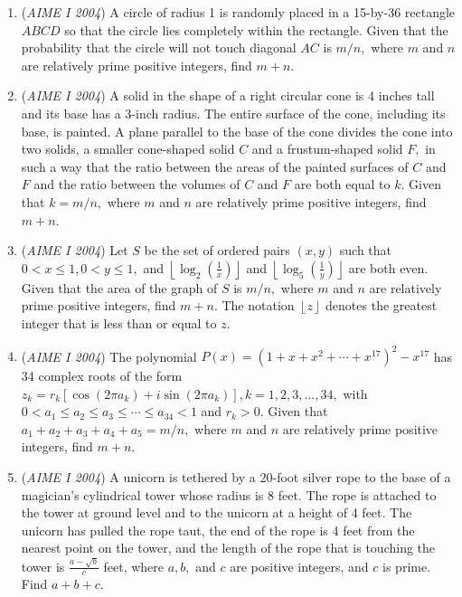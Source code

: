 \begin{enumerate}
	\item (\textit{AIME I 2004}) A circle of radius 1 is randomly placed in a 15-by-36 rectangle $ABCD$ so that the circle lies completely within the rectangle. Given that the probability that the circle will not touch diagonal $AC$ is $m/n,$ where $m$ and $n$ are relatively prime positive integers, find $m + n.$


	\item (\textit{AIME I 2004}) A solid in the shape of a right circular cone is 4 inches tall and its base has a 3-inch radius. The entire surface of the cone, including its base, is painted. A plane parallel to the base of the cone divides the cone into two solids, a smaller cone-shaped solid $C$ and a frustum-shaped solid $F,$ in such a way that the ratio between the areas of the painted surfaces of $C$ and $F$ and the ratio between the volumes of $C$ and $F$ are both equal to $k.$ Given that $k=m/n,$ where $m$ and $n$ are relatively prime positive integers, find $m+n.$


	\item (\textit{AIME I 2004}) Let $S$ be the set of ordered pairs $(x, y)$ such that $0 < x \le 1, 0<y\le 1,$ and $\left \lfloor{\log_2{\left(\frac 1x\right)}}\right \rfloor$ and $\left \lfloor{\log_5{\left(\frac 1y\right)}}\right \rfloor$ are both even. Given that the area of the graph of $S$ is $m/n,$ where $m$ and $n$ are relatively prime positive integers, find $m+n.$ The notation $\left \lfloor{z}\right \rfloor$ denotes the greatest integer that is less than or equal to $z.$


	\item (\textit{AIME I 2004}) The polynomial $P(x)=(1+x+x^2+\cdots+x^{17})^2-x^{17}$ has 34 complex roots of the form $z_k = r_k[\cos(2\pi a_k)+i\sin(2\pi a_k)], k=1, 2, 3,\ldots, 34,$ with $0 < a_1 \le a_2 \le a_3 \le \cdots \le a_{34} < 1$ and $r_k>0.$ Given that $a_1 + a_2 + a_3 + a_4 + a_5 = m/n,$ where $m$ and $n$ are relatively prime positive integers, find $m+n.$


	\item (\textit{AIME I 2004}) A unicorn is tethered by a 20-foot silver rope to the base of a magician's cylindrical tower whose radius is 8 feet. The rope is attached to the tower at ground level and to the unicorn at a height of 4 feet. The unicorn has pulled the rope taut, the end of the rope is 4 feet from the nearest point on the tower, and the length of the rope that is touching the tower is $\frac{a-\sqrt{b}}c$ feet, where $a, b,$ and $c$ are positive integers, and $c$ is prime. Find $a+b+c.$



\end{enumerate}

